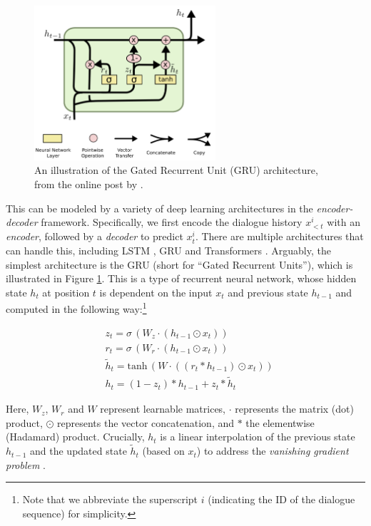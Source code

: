 \begin{figure}[th!]
\centering
\includegraphics[width=0.6\textwidth]{gated_recurrent_unit.pdf}
\caption{An illustration of the Gated Recurrent Unit (GRU) architecture, from the online post by \citet{olah2015understanding}.}
\label{02_fig:gru_architecture}
\end{figure}

This can be modeled by a variety of deep learning architectures in the \textit{encoder-decoder} framework. Specifically, we first encode the dialogue history $x^i_{<t}$ with an \textit{encoder}, followed by a \textit{decoder} to predict $x^i_{t}$. There are multiple architectures that can handle this, including LSTM \citep{hochreiter1997long}, GRU \citep{cho2014properties} and Transformers \citep{NIPS2017_3f5ee243}. Arguably, the simplest architecture is the GRU (short for ``Gated Recurrent Units''), which is illustrated in Figure \ref{02_fig:gru_architecture}. This is a type of recurrent neural network, whose hidden state $h_t$ at position $t$ is dependent on the input $x_t$ and previous state $h_{t-1}$ and computed in the following way:\footnote{Note that we abbreviate the superscript $i$ (indicating the ID of the dialogue sequence) for simplicity.}

\begin{align*}\label{eqt:gru}
& z_t = \sigma \,(W_z \cdot (h_{t-1} \odot x_t)) \\
& r_t = \sigma \,(W_r \cdot (h_{t-1} \odot x_t)) \\
& \tilde{h}_t = \mathrm{tanh} \,(W \cdot ((r_t * h_{t-1}) \odot x_t)) \\
& h_t = (1 - z_t) * h_{t-1} + z_t * \tilde{h}_t
\end{align*}

\noindent
Here, $W_z$, $W_r$ and $W$ represent learnable matrices, $\cdot$ represents the matrix (dot) product, $\odot$ represents the vector concatenation, and $*$ the elementwise (Hadamard) product. Crucially, $h_t$ is a linear interpolation of the previous state $h_{t-1}$ and the updated state $\tilde{h}_t$ (based on $x_t$) to address the \textit{vanishing gradient problem} \citep{bengio1994learning}.

